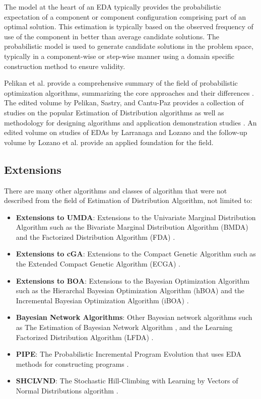 \begin{bibunit}
The model at the heart of an EDA typically provides the probabilistic expectation of a component or component configuration comprising part of an optimal solution. This estimation is typically based on the observed frequency of use of the component in better than average candidate solutions. The probabilistic model is used to generate candidate solutions in the problem space, typically in a component-wise or step-wise manner using a domain specific construction method to ensure validity.

Pelikan et al. provide a comprehensive summary of the field of probabilistic optimization algorithms, summarizing the core approaches and their differences \cite{Pelikan2002b}.
The edited volume by Pelikan, Sastry, and Cantu-Paz provides a collection of studies on the popular Estimation of Distribution algorithms as well as methodology for designing algorithms and application demonstration studies \cite{Pelikan2006}.
An edited volume on studies of EDAs by Larranaga and Lozano \cite{Larranaga2002} and the follow-up volume by Lozano et al. \cite{Lozano2006} provide an applied foundation for the field.

% 
% 
\subsection{Extensions}
There are many other algorithms and classes of algorithm that were not described from the field of Estimation of Distribution Algorithm, not limited to:

\begin{itemize}
	\item \textbf{Extensions to UMDA}: Extensions to the Univariate Marginal Distribution Algorithm such as the Bivariate Marginal Distribution Algorithm (BMDA) \cite{Pelikan1998, Pelikan1999} and the Factorized Distribution Algorithm (FDA) \cite{Muhlenbein1999}.
	\item \textbf{Extensions to cGA}: Extensions to the Compact Genetic Algorithm such as the Extended Compact Genetic Algorithm (ECGA) \cite{Harik1999a, Harik2006}.
	\item \textbf{Extensions to BOA}: Extensions to the Bayesian Optimization Algorithm such as the Hierarchal Bayesian Optimization Algorithm (hBOA) \cite{Pelikan2000, Pelikan2001b} and the Incremental Bayesian Optimization Algorithm (iBOA) \cite{Pelikan2008}.
	\item \textbf{Bayesian Network Algorithms}: Other Bayesian network algorithms such as The Estimation of Bayesian Network Algorithm \cite{Etxeberria1999}, and the Learning Factorized Distribution Algorithm (LFDA) \cite{Muehlenbein1999}.
	\item \textbf{PIPE}: The Probabilistic Incremental Program Evolution that uses EDA methods for constructing programs \cite{Salustowicz1997}. 
	\item \textbf{SHCLVND}: The Stochastic Hill-Climbing with Learning by Vectors of Normal Distributions algorithm \cite{Rudlof1996}.
\end{itemize}

\putbib
\end{bibunit}

